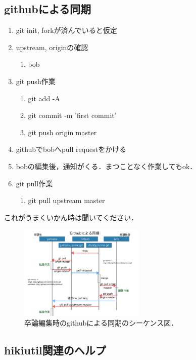 \subsection{githubによる同期}
\begin{enumerate}
\item git init, forkが済んでいると仮定
\item upstream, originの確認
\begin{enumerate}
\item bob%
\end{enumerate}
\item git push作業
\begin{enumerate}
\item git add -A
\item git commit -m 'first commit'
\item git push origin master
\end{enumerate}
\item githubでbobへpull requestをかける
\item bobの編集後，通知がくる．まつことなく作業してもok．
\item git pull作業
\begin{enumerate}
\item git pull upstream master
\end{enumerate}
\end{enumerate}
これがうまくいかん時は聞いてください．

\begin{figure}[htbp]\begin{center}
\includegraphics[width=6cm,bb=0 0 442 500]{../figs/./hikiutils_bob.004.jpeg}
\caption{卒論編集時のgithubによる同期のシーケンス図．}
\label{default}\end{center}\end{figure}
\subsection{hikiutil関連のヘルプ}
